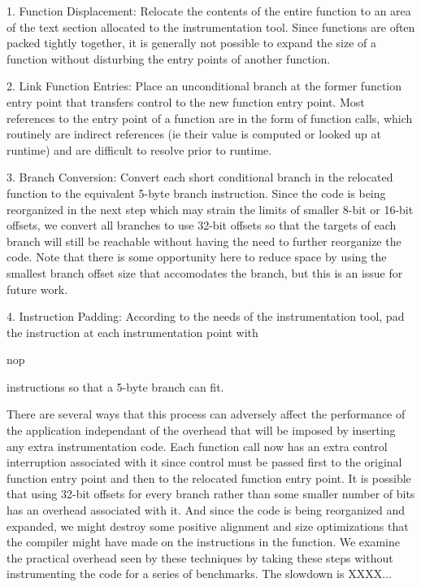 1. Function Displacement: Relocate the contents of the entire function to an area of the text section allocated
to the instrumentation tool. Since functions are often packed tightly together, it is generally not possible to
expand the size of a function without disturbing the entry points of another function.

2. Link Function Entries: Place an unconditional branch at the former function entry point that transfers control
to the new function entry point. Most references to the entry point of a function are in the form of function calls, which
routinely are indirect references (ie their value is computed or looked up at runtime) and are difficult to resolve
prior to runtime.

3. Branch Conversion: Convert each short conditional branch in the relocated function to the equivalent
5-byte branch instruction. Since the code is being reorganized in the next step which may strain the limits of
smaller 8-bit or 16-bit offsets, we convert all branches to use 32-bit offsets so that the targets of each branch
will still be reachable without having the need to further reorganize the code. Note that there is some opportunity
here to reduce space by using the smallest branch offset size that accomodates the branch, but this is an issue
for future work.

4. Instruction Padding: According to the needs of the instrumentation tool, pad the instruction at each instrumentation
point with \begin{it}nop\end{it} instructions so that a 5-byte branch can fit.

There are several ways that this process can adversely affect the performance of the application independant of the overhead
that will be imposed by inserting any extra instrumentation code. Each function call
now has an extra control interruption associated with it since control must be passed first to the original function entry
point and then to the relocated function entry point. It is possible that using 32-bit offsets for every branch rather than
some smaller number of bits has an overhead associated with it. And since the code is being reorganized and expanded, 
we might destroy some positive alignment and size optimizations that the compiler might have made on the instructions in the
function. We examine the practical overhead seen by these techniques by taking these steps without instrumenting the code
for a series of benchmarks. The slowdown is XXXX...

